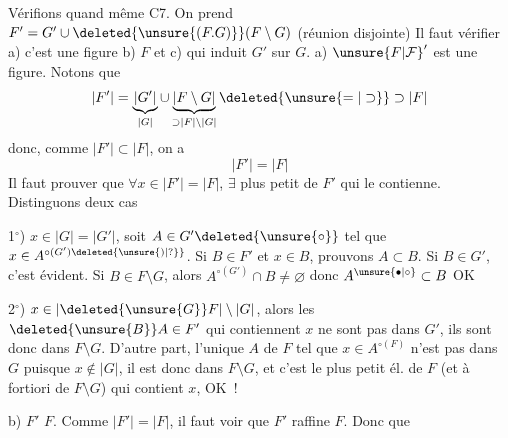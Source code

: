 Vérifions quand même C7.
On prend $F'=G'\cup\deleted{\unsure{(F.G)}}(F\setminus G)$ (réunion disjointe)
Il faut vérifier a) c'est une figure b)   $F$ et c) qui induit $G'$ sur $G$.
a) ${\unsure{F|\mathcal F}}'$ est une figure.  Notons que 
\[
 |F'|=\underbrace{|G'|}_{|G|}\cup\underbrace{|F\setminus G|}_{\supset |F|\setminus |G|}\deleted{\unsure{=|\supset}}\supset |F|
\]
donc, comme $|F'|\subset |F|$, on a
\[
 |F'|=|F|
\]
Il faut prouver que $\forall x\in |F'|=|F|$, $\exists$ plus petit  de $F'$ qui le contienne. Distinguons deux cas

1$^\circ$) $x\in |G|=|G'|$, soit $A\in G'\deleted{\unsure{\circ}}$ tel que $x\in A^{\circ(G')\deleted{\unsure{)|?}}}$. Si $B\in F'$ et  $x\in B$, prouvons $A\subset B$. Si $B\in G'$, c'est évident. Si $B\in F\setminus G$, alors  $A^{\circ(G')}\cap B\ne\varnothing$ donc $A^{\unsure{\bullet|\circ}}\subset B$ OK

2$^\circ$) $x\in |\deleted{\unsure{G}}F|\setminus |G|$, alors les $\deleted{\unsure{B}}A\in F'$ qui contiennent $x$ ne sont pas dans $G'$, ils sont donc dans $F\setminus G$. D'autre part, l'unique  $A$ de $F$ tel que $x\in A^{\circ(F)}$ n'est pas dans $G$ puisque $x\notin |G|$, il est donc dans $F\setminus G$, et  c'est le plus petit él. de $F$ (et à fortiori de $F\setminus G$) qui contient $x$, OK~!

b) $F'$  $F$. Comme $|F'|=|F|$, il faut voir  que $F'$ raffine $F$. Donc  que

